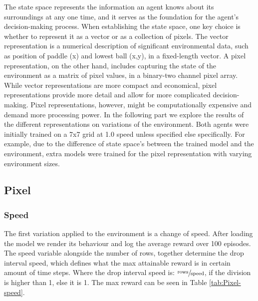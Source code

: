 \documentclass{article}
\begin{document}
The state space represents the information an agent knows about its surroundings at any one time, and it serves as the foundation for the agent's decision-making process. 
When establishing the state space, one key choice is whether to represent it as a vector or as a collection of pixels.
The vector representation is a numerical description of significant environmental data, such as position of paddle (x) and lowest ball (x,y), in a fixed-length vector.
A pixel representation, on the other hand, includes capturing the state of the environment as a matrix of pixel values, in a binary-two channel pixel array.
While vector representations are more compact and economical, pixel representations provide more detail and allow for more complicated decision-making.
Pixel representations, however, might be computationally expensive and demand more processing power.
In the following part we explore the results of the different representations on variations of the environment.
Both agents were initially trained on a 7x7 grid at 1.0 speed unless specified else specifically.
For example, due to the difference of state space's between the trained model and the environment, extra models were trained for the pixel representation with varying environment sizes.


\subsection{Pixel}
\label{ENV-PV}


\subsubsection{Speed}
The first variation applied to the environment is a change of speed.
After loading the model we render its behaviour and log the average reward over 100 episodes. 
The speed variable alongside the number of rows, together determine the drop interval speed, which defines what the max attainable reward is in certain amount of time steps. 
Where the drop interval speed is: $\sfrac{\text{rows}}{\text{speed}}$, if the division is higher than 1, else it is 1. 
The max reward can be seen in Table \ref{tab:Pixel-speed}. 
\end{document}
